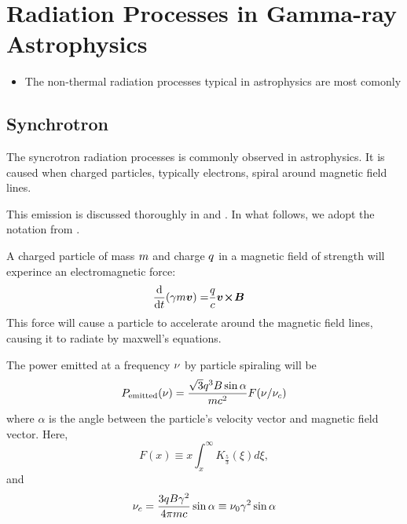 \section{Radiation Processes in Gamma-ray Astrophysics}



\begin{itemize}
  \item The non-thermal radiation processes typical
    in astrophysics are most comonly
\end{itemize}

\subsection{Synchrotron}


The syncrotron radiation processes is commonly observed
in astrophysics. It is caused when charged particles,
typically electrons, spiral around magnetic field lines.

This emission is discussed thoroughly in
\cite{blumenthal_1970a_bremsstrahlung-synchrotron} and
\cite{rybicki_1979a_radiative-processes}.
In what follows, we adopt the notation from
\cite{houck_2006a_models-nonthermal}.

A charged particle of 
mass $m$ and charge $q$ in a magnetic field
of strength 
\MagneticFieldVector
will experince an
electromagnetic force:
\begin{align}
  \frac{\text{d}}{\text{d}t} (\gamma m \boldsymbol{v}) = & \frac{q}{c} \boldsymbol{v}\!\boldsymbol{\times}\!\boldsymbol{B}
\end{align}
This force will cause a particle to accelerate around
the magnetic field lines, causing it
to radiate by maxwell's equations.

The power emitted at a frequency $\nu$ 
by particle spiraling will be
\begin{equation}
  \eqnlabel{power_emitted_particle_sync}
  \power_\text{emitted}(\frequency) = 
  \frac{\sqrt{3} \charge^3 B \sin\alpha}{\mass \speedoflight^2} F(\frequency/\frequency_c)
\end{equation}
where $\alpha$ is the angle between the particle's velocity vector and
magnetic field vector.
Here,
\begin{equation}
  F(x) \equiv x \int_x^\infty K_{\tfrac{5}{3}} (\xi) d\xi,
\end{equation}
and
\begin{equation}
\nu_c = \frac{3q B \gamma^2}{4\pi m c} 
\sin\alpha \equiv \nu_0 \gamma^2 \sin\alpha
\end{equation}


